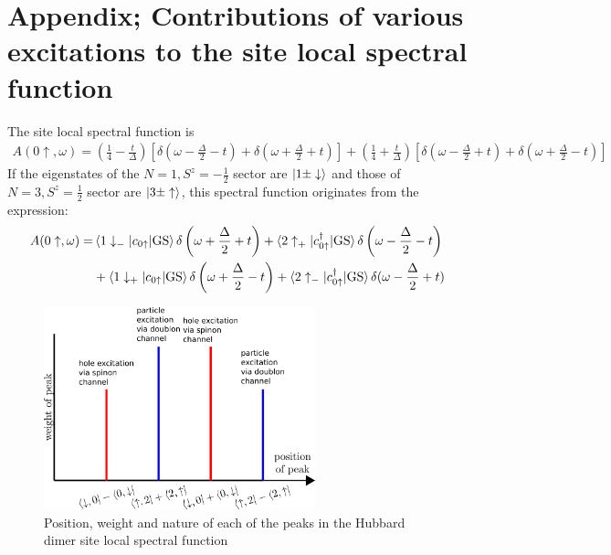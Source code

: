 \documentclass[12pt]{article}
\numberwithin{equation}{section}
\begin{document}
\section*{Appendix; Contributions of various excitations to the site local spectral function}
The site local spectral function is
\begin{equation}\begin{aligned}
	A(0\uparrow, \omega) = \left( \frac{1}{4} - \frac{t}{\Delta} \right)\left[\delta(\omega - \frac{\Delta}{2} - t) + \delta(\omega + \frac{\Delta}{2} + t)\right]\nonumber + \left( \frac{1}{4} + \frac{t}{\Delta} \right) \left[\delta(\omega - \frac{\Delta}{2} + t) + \delta(\omega + \frac{\Delta}{2} - t)\right]
\end{aligned}\end{equation}
If the eigenstates of the $N=1, S^z = - \frac{1}{2}$ sector are $\ket{1 \pm \downarrow}$ and those of $N=3, S^z = \frac{1}{2}$ sector are $\ket{3 \pm \uparrow}$, this spectral function originates from the expression:
\begin{equation}\begin{aligned}
	A(0\uparrow, \omega) =& \braket{1 \downarrow_- | c_{0 \uparrow} | \text{GS}} \delta\left(\omega + \frac{\Delta}{2} + t\right) + \braket{2 \uparrow_+ | c^\dagger_{0 \uparrow} | \text{GS}}\delta\left(\omega - \frac{\Delta}{2} - t\right) \\
			      &+ \braket{1 \downarrow_+ | c_{0 \uparrow} | \text{GS}}\delta\left(\omega + \frac{\Delta}{2} - t\right) + \braket{2 \uparrow_- | c^\dagger_{0 \uparrow} | \text{GS}}\delta(\omega - \frac{\Delta}{2} + t)
\end{aligned}\end{equation}
\begin{figure}[htpb]
	\centering
	\includegraphics[width=0.7\textwidth]{./dimer-peaks.png}
	\caption{Position, weight and nature of each of the peaks in the Hubbard dimer site local spectral function}
\end{figure}
\end{document}
